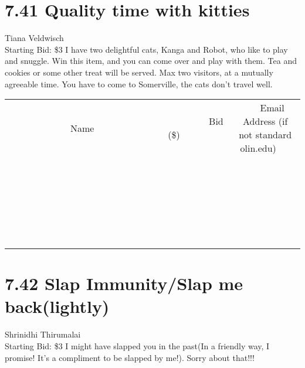 \documentclass[11pt]{article}
\begin{document}
\section*{7.41 Quality time with kitties}
Tiana Veldwisch
\\
Starting Bid: \$3
\newline
I have two delightful cats, Kanga and Robot, who like to play and snuggle. Win this item, and you can come over and play with them. Tea and cookies or some other treat will be served. Max two visitors, at a mutually agreeable time. You have to come to Somerville, the cats don't travel well.
\\[6ex]
\begin{tabular}{c c c}
~~~~~~~~~~~~~Name~~~~~~~~~~~~~ & ~~~~~~~~~Bid (\$)~~~~~~~~~  & ~~~Email Address (if not standard olin.edu)~~~\\
 & & \\
\hline
 & & \\
\hline
 & & \\
\hline
 & & \\
\hline
 & & \\
\hline
 & & \\
\hline
 & & \\
\hline
 & & \\
\hline
 & & \\
\hline
 & & \\
\hline
 & & \\
\hline
 & & \\
\hline
 & & \\
\hline
 & & \\
\hline
 & & \\
\hline
 & & \\
\hline
 & & \\
\hline
 & & \\
\hline
 & & \\
\hline
 & & \\
\hline
 & & \\
\hline
 & & \\
\hline
 & & \\
\hline
 & & \\
\hline
 & & \\
\hline
 & & \\
\hline
\end{tabular}
\newpage
\section*{7.42 Slap Immunity/Slap me back(lightly)}
Shrinidhi Thirumalai
\\
Starting Bid: \$3
\newline
I might have slapped you in the past(In a friendly way, I promise! It's a compliment to be slapped by me!). Sorry about that!!!
\end{document}
